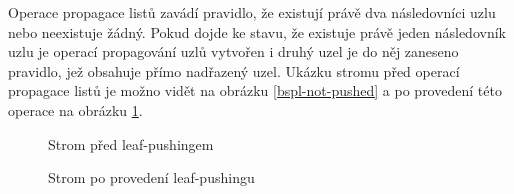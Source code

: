 Operace propagace listů zavádí pravidlo, že existují právě dva následovníci uzlu nebo neexistuje žádný.
Pokud dojde ke stavu, že existuje právě jeden následovník uzlu je operací propagování uzlů
vytvořen i druhý uzel je do něj zaneseno pravidlo, jež obsahuje přímo nadřazený uzel.
Ukázku stromu před operací propagace listů je možno vidět na obrázku \ref{bspl-not-pushed}
a po provedení této operace na obrázku \ref{bspl-pushed}.

\begin{figure}[!htbp]
	\begin{floatrow}
			{\caption{Strom před leaf-pushingem}\label{bspl-not-pushed}}
			{\caption{Strom po provedení leaf-pushingu}\label{bspl-pushed}}
	\end{floatrow}
\end{figure}

